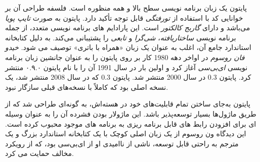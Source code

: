پایتون یک زبان برنامه نویسی سطح بالا و همه منظوره است. فلسفه طراحی آن
بر خوانایی کد با استفاده از \textit{تورفتگی} قابل توجه تأکید دارد. پایتون به
صورت \textit{تایپ پویا} می‌باشد و دارای \textit{گاربج کالکتور} است.
این پارادایم های برنامه نویسی متعدد،
از جمله برنامه نویسی \textit{ساختاریافته}،
\textit{شی‌گرا} و \textit{تابعی} را
پشتیبانی می‌کند. به دلیل کتابخانه استاندارد جامع آن، اغلب به عنوان یک
زبان «همراه با باتری» توصیف می شود. \textit{خیدو فان روسوم} در اواخر دهه 1980
کار بر روی پایتون را به عنوان جانشین زبان برنامه نویسی \textit{ای‌بی‌سی} آغاز کرد و
اولین بار در سال 1991 آن را با نام پایتون ۰.۹.۰ منتشر کرد.
پایتون 0.3 در سال 2000 منتشر شد. پایتون 0.3 که در سال 2008 منتشر شد، یک نسخه اصلی
بود که کاملاً با نسخه‌های قبلی سازگار نبود.

پایتون به‌جای ساختن تمام قابلیت‌های خود در هسته‌اش، به گونه‌ای طراحی شد که
از طریق ماژول‌ها بسیار توسعه‌پذیر باشد. این ماژولار بودن فشرده آن را به
عنوان وسیله ای برای افزودن رابط های قابل برنامه ریزی به برنامه های
موجود محبوب کرده است. این دیدگاه ون روسوم از یک زبان اصلی کوچک با یک
کتابخانه استاندارد بزرگ و یک مترجم به راحتی قابل توسعه، ناشی از
ناامیدی او از ای‌بی‌سی بود، که از رویکرد مخالف حمایت می کرد.





